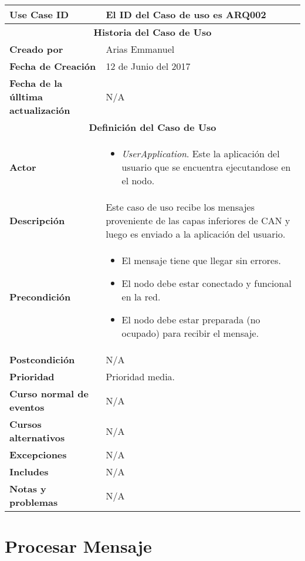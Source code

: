\begin{longtable}{|p{5cm}|p{8cm}|}
  \hline
  \textbf{Use Case ID} & El ID del Caso de uso es ARQ002 \\ \hline
  \multicolumn{2}{|c|}{\Large\textbf{Historia del Caso de Uso}} \\ \hline
  \textbf{Creado por} & Arias Emmanuel \\ \hline
  \textbf{Fecha de Creación} & 12 de Junio del 2017 \\ \hline
  \textbf{Fecha de la úlltima actualización} & N/A \\ \hline
  \multicolumn{2}{|c|}{\Large\textbf{Definición del Caso de Uso}} \\ \hline
  \textbf{Actor} & \begin{itemize}
    \item \textit{UserApplication}. Este la aplicación del usuario que se encuentra ejecutandose en el nodo.
  \end{itemize} \\ \hline
  \textbf{Descripción} & Este caso de uso recibe los mensajes proveniente de las capas inferiores de CAN
y luego es enviado a la aplicación del usuario. \\ \hline
  \textbf{Precondición} & \begin{itemize}
\item El mensaje tiene que llegar sin errores.
\item El nodo debe estar conectado y funcional en la red.
\item El nodo debe estar preparada (no ocupado) para recibir el mensaje.
\end{itemize} \\ \hline
  \textbf{Postcondición}  & N/A \\ \hline
  \textbf{Prioridad} & Prioridad media. \\ \hline
  \textbf{Curso normal de eventos} & N/A \\ \hline
\textbf{Cursos alternativos} & N/A \\ \hline
\textbf{Excepciones} & N/A \\ \hline
\textbf{Includes} & N/A \\ \hline
\textbf{Notas y problemas} & N/A \\ \hline
\end{longtable}


\section{Procesar Mensaje}

